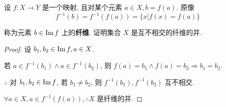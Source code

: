 \documentclass{ctexart}
\begin{document}
\begin{exercise}%
    设 $f:X\to Y$ 是一个映射, 且对某个元素 $a\in X,b=f(a)$. 原像
    \[f^{-1}(b)=f^{-1}(f(a))=\{x|f(x)=f(a)\}\]

    称为元素 $b\in\operatorname{Im} f$ 上的\textbf{纤维}. 证明集合 $X$ 是互不相交的纤维的并.
\end{exercise}
\begin{proof}
    设 $b_1,b_2\in\operatorname{Im} f,a\in X$.

    若 $a\in f^{-1}(b_1)\land a\in f^{-1}(b_2)$, 则 $f(a)=b_1\land f(a)=b_2\Rightarrow b_1=b_2$.

    $\therefore$ 对 $b_1,b_2\in\operatorname{Im} f$, 若 $b_1\neq b_2$, 则 $f^{-1}(b_1),f^{-1}(b_2)$ 互不相交.

    $\forall a\in X,a\in f^{-1}(f(a)),\therefore X$ 是纤维的并.
\end{proof}
\end{document}
